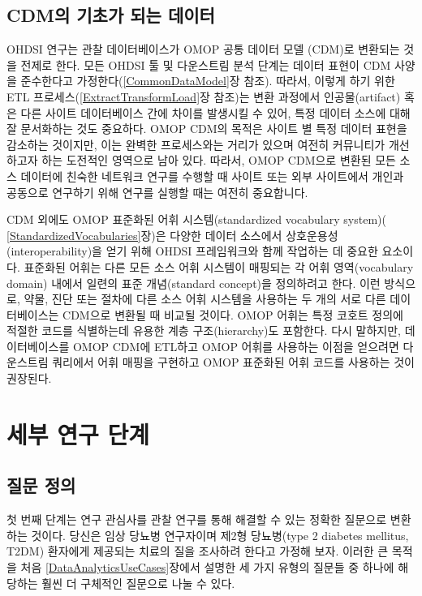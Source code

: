 \documentclass[11pt]{book}
\theoremstyle{definition}
\theoremstyle{definition}
\theoremstyle{definition}
\theoremstyle{remark}
\begin{document}
\subsection{CDM의 기초가 되는 데이터}\label{cdm---}

OHDSI 연구는 관찰 데이터베이스가 OMOP 공통 데이터 모델 (CDM)로 변환되는
것을 전제로 한다. 모든 OHDSI 툴 및 다운스트림 분석 단계는 데이터 표현이
CDM 사양을 준수한다고 가정한다(\ref{CommonDataModel}장 참조). 따라서,
이렇게 하기 위한 ETL 프로세스(\ref{ExtractTransformLoad}장 참조)는 변환
과정에서 인공물(artifact) 혹은 다른 사이트 데이터베이스 간에 차이를
발생시킬 수 있어, 특정 데이터 소스에 대해 잘 문서화하는 것도 중요하다.
OMOP CDM의 목적은 사이트 별 특정 데이터 표현을 감소하는 것이지만, 이는
완벽한 프로세스와는 거리가 있으며 여전히 커뮤니티가 개선하고자 하는
도전적인 영역으로 남아 있다. 따라서, OMOP CDM으로 변환된 모든 소스
데이터에 친숙한 네트워크 연구를 수행할 때 사이트 또는 외부 사이트에서
개인과 공동으로 연구하기 위해 연구를 실행할 때는 여전히 중요합니다.

CDM 외에도 OMOP 표준화된 어휘 시스템(standardized vocabulary system)(
\ref{StandardizedVocabularies}장)은 다양한 데이터 소스에서
상호운용성(interoperability)을 얻기 위해 OHDSI 프레임워크와 함께
작업하는 데 중요한 요소이다. 표준화된 어휘는 다른 모든 소스 어휘
시스템이 매핑되는 각 어휘 영역(vocabulary domain) 내에서 일련의 표준
개념(standard concept)을 정의하려고 한다. 이런 방식으로, 약물, 진단 또는
절차에 다른 소스 어휘 시스템을 사용하는 두 개의 서로 다른 데이터베이스는
CDM으로 변환될 때 비교될 것이다. OMOP 어휘는 특정 코호트 정의에 적절한
코드를 식별하는데 유용한 계층 구조(hierarchy)도 포함한다. 다시 말하지만,
데이터베이스를 OMOP CDM에 ETL하고 OMOP 어휘를 사용하는 이점을 얻으려면
다운스트림 쿼리에서 어휘 매핑을 구현하고 OMOP 표준화된 어휘 코드를
사용하는 것이 권장된다.

\section{세부 연구 단계}\label{--}

\subsection{질문 정의}\label{-}

첫 번째 단계는 연구 관심사를 관찰 연구를 통해 해결할 수 있는 정확한
질문으로 변환하는 것이다. 당신은 임상 당뇨병 연구자이며 제2형
당뇨병(type 2 diabetes mellitus, T2DM) 환자에게 제공되는 치료의 질을
조사하려 한다고 가정해 보자. 이러한 큰 목적을 처음
\ref{DataAnalyticsUseCases}장에서 설명한 세 가지 유형의 질문들 중 하나에
해당하는 훨씬 더 구체적인 질문으로 나눌 수 있다.
\end{document}
